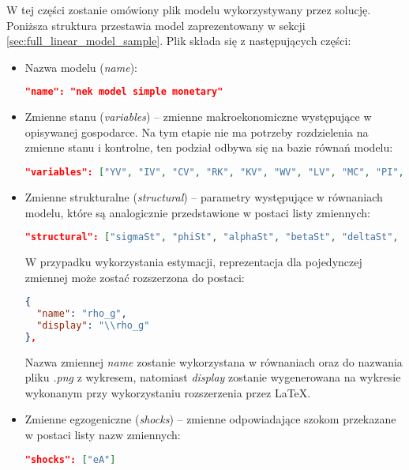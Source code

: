 W tej części zostanie omówiony plik modelu wykorzystywany przez solucję. Poniższa struktura przestawia model zaprezentowany w sekcji \ref{sec:full_linear_model_sample}. Plik składa się z następujących części:
\begin{itemize}
    \item Nazwa modelu (\emph{name}):
    \begin{lstlisting}[language=json,firstnumber=1]
 "name": "nek model simple monetary"
    \end{lstlisting}
    
    \item Zmienne stanu (\emph{variables}) -- zmienne makroekonomiczne występujące w opisywanej gospodarce. Na tym etapie nie ma potrzeby rozdzielenia na zmienne stanu i kontrolne, ten podział odbywa się na bazie równań modelu:
    \begin{lstlisting}[language=json,firstnumber=2]
 "variables": ["YV", "IV", "CV", "RK", "KV", "WV", "LV", "MC", "PI", "AV", "RQ"]
    \end{lstlisting}
    \item Zmienne strukturalne (\emph{structural}) -- parametry występujące w równaniach modelu, które są analogicznie przedstawione w postaci listy zmiennych:
    \begin{lstlisting}[language=json,firstnumber=3]
 "structural": ["sigmaSt", "phiSt", "alphaSt", "betaSt", "deltaSt", "rhoASt", "psiSt", "thetaSt", "phiPSt", "rhoQSt"]
    \end{lstlisting}
    W przypadku wykorzystania estymacji, reprezentacja dla pojedynczej zmiennej może zostać rozszerzona do postaci:
    \begin{lstlisting}[language=json,firstnumber=2]
{
  "name": "rho_g",
  "display": "\\rho_g"
},
    \end{lstlisting}
    Nazwa zmiennej \emph{name} zostanie wykorzystana w równaniach oraz do nazwania pliku \emph{.png} z wykresem, natomiast \emph{display} zostanie wygenerowana na wykresie wykonanym przy wykorzystaniu rozszerzenia  przez \LaTeX.
    \item Zmienne egzogeniczne (\emph{shocks}) -- zmienne odpowiadające szokom przekazane w postaci listy nazw zmiennych:
    \begin{lstlisting}[language=json,firstnumber=4]
 "shocks": ["eA"]
    \end{lstlisting}
    

\end{itemize}
